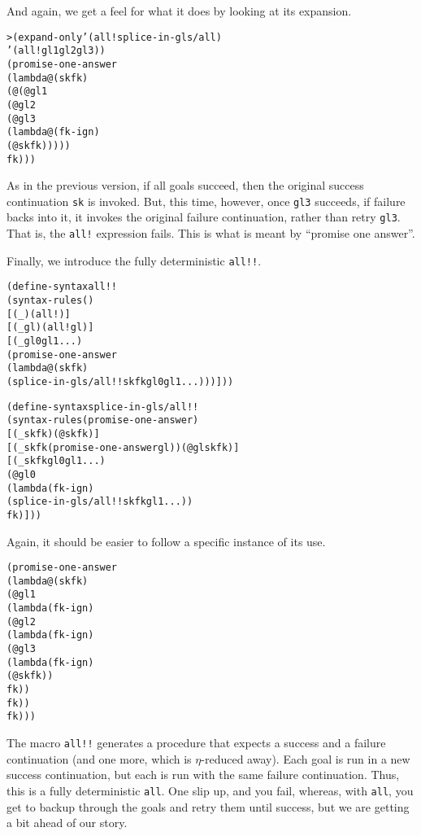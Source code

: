 \noindent
And again, we get a feel for what it does by looking at its
expansion.

\begin{alltt}
> (expand-only '(all! splice-in-gls/all)
    '(all! gl1 gl2 gl3))
(promise-one-answer
  (lambda@ (sk fk)
    (@ (@ gl1
         (@ gl2
           (@ gl3
             (lambda@ (fk-ign)
               (@ sk fk)))))
       fk)))
\end{alltt}

As in the previous version, if all goals succeed, then the
original success continuation \texttt{sk} is invoked.  But, this time,
however, once \texttt{gl3} succeeds, if failure backs into it, it
invokes the original failure continuation, rather than retry
\texttt{gl3}.  That is, the \texttt{all!} expression fails. This is
what is meant by ``promise one answer''.

Finally, we introduce the fully deterministic \texttt{all!!}.

\begin{alltt}
(define-syntax all!!
  (syntax-rules ()
    [(_) (all!)]
    [(_ gl) (all! gl)]
    [(_ gl0 gl1 ...)
     (promise-one-answer
       (lambda@ (sk fk)
         (splice-in-gls/all!! sk fk gl0 gl1 ...)))]))

(define-syntax splice-in-gls/all!!
  (syntax-rules (promise-one-answer)
    [(_ sk fk) (@ sk fk)]
    [(_ sk fk (promise-one-answer gl)) (@ gl sk fk)]
    [(_ sk fk gl0 gl1 ...)
     (@ gl0
       (lambda (fk-ign)
         (splice-in-gls/all!! sk fk gl1 ...))
       fk)]))
\end{alltt}

Again, it should be easier to follow a specific instance of its use.

\begin{alltt}
(promise-one-answer
  (lambda@ (sk fk)
    (@ gl1
      (lambda (fk-ign)
        (@ gl2
          (lambda (fk-ign)
            (@ gl3
              (lambda (fk-ign)
                (@ sk fk))
              fk))
          fk))
      fk)))
\end{alltt}

The macro \texttt{all!!} generates a procedure that expects a success
and a failure continuation (and one more, which is $\eta$-reduced
away).  Each goal is run in a new success continuation, but each
is run with the same failure continuation.  Thus, this is a fully
deterministic \texttt{all}.  One slip up, and you fail, whereas, with
\texttt{all}, you get to backup through the goals and retry them
until success, but we are getting a bit ahead of our story.

